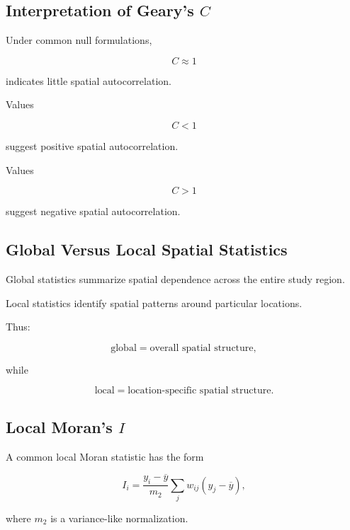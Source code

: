 \subsection{Interpretation of Geary's \(C\)}
\label{subsec:gearys-c-interpretation}

Under common null formulations,

\[
\boxed{
C\approx1
}
\]

indicates little spatial autocorrelation.

Values

\[
\boxed{
C<1
}
\]

suggest positive spatial autocorrelation.

Values

\[
\boxed{
C>1
}
\]

suggest negative spatial autocorrelation.

\subsection{Global Versus Local Spatial Statistics}
\label{subsec:global-versus-local-spatial}

Global statistics summarize spatial dependence across the entire study
region.

Local statistics identify spatial patterns around particular locations.

Thus:

\[
\boxed{
\text{global}
=
\text{overall spatial structure},
}
\]

while

\[
\boxed{
\text{local}
=
\text{location-specific spatial structure}.
}
\]

\subsection{Local Moran's \(I\)}
\label{subsec:local-morans-i}

A common local Moran statistic has the form

\[
\boxed{
I_i
=
\frac{
y_i-\overline{y}
}{
m_2
}
\sum_j
w_{ij}
(
y_j-\overline{y}
),
}
\]

where \(m_2\) is a variance-like normalization.

